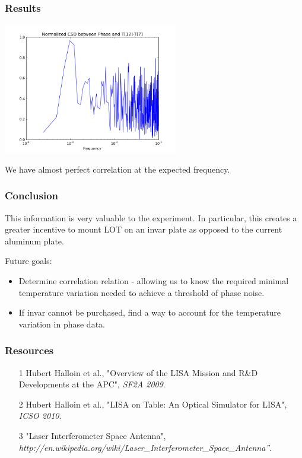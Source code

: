\documentclass[notes, compressed, blue]{beamer}
\begin{document}
\begin{frame}
\frametitle{Results}

\begin{center}\includegraphics[width=3in]{csd_modphasetemp.png}\end{center}

We have almost perfect correlation at the expected frequency.\\

\end{frame}



\begin{frame}
\frametitle{Conclusion}

This information is very valuable to the experiment. In particular, this creates a greater incentive to mount LOT on an invar plate as opposed to the current aluminum plate.\\
\vspace{.3cm}

Future goals:
\begin{itemize}
\item{Determine correlation relation - allowing us to know the required minimal temperature variation needed to achieve a threshold of phase noise.}
\item{If invar cannot be purchased, find a way to account for the temperature variation in phase data.}
\end{itemize}

\end{frame}



\begin{frame}
\frametitle{Resources}
\begin{itemize}
\item [1] Hubert Halloin et al., "Overview of the LISA Mission and R\&D Developments at the APC", \textit{SF2A 2009}.
\item [2] Hubert Halloin et al., "LISA on Table: An Optical Simulator for LISA", \textit{ICSO 2010}.
\item [3] "Laser Interferometer Space Antenna", \textit{http://en.wikipedia.org/wiki/Laser\_Interferometer\_Space\_Antenna''}.
\end{itemize}

\end{frame}
\end{document}
